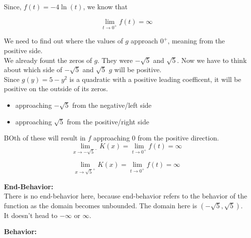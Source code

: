 \documentclass{ximera}
\begin{document}
Since, $f(t) = -4 \ln(t)$, we know that 


\[
\lim\limits_{t \to 0^+} f(t) = \infty
\]



We need to find out where the values of $g$ approach $0^+$, meaning from the positive side. \\


We already fount the zeros of $g$.  They were $-\sqrt{5}$ and $\sqrt{5}$.  Now we have to think about which side of $-\sqrt{5}$ and $\sqrt{5}$ $g$ will be positive. \\


Since $g(y) = 5 - y^2$ is a quadratic with a positive leading coefficent, it will be positive on the outside of its zeros. 

\begin{itemize}
\item approaching $-\sqrt{5}$ from the negative/left side
\item approaching $\sqrt{5}$ from the positive/right side
\end{itemize}

BOth of these will result in $f$ approaching $0$ from the positive direction. \\



\[
\lim\limits_{x \to -\sqrt{5}^-} K(x)  = \lim\limits_{t \to 0^+} f(t) = \infty
\]



\[
\lim\limits_{x \to \sqrt{5}^+} K(x)  = \lim\limits_{t \to 0^+} f(t) = \infty
\]
















\textbf{\textcolor{blue!55!black}{End-Behavior:}} \\

There is no end-behavior here, because end-behavior refers to the behavior of the function as the domain becomes unbounded.  The domain here is $(-\sqrt{5}, \sqrt{5})$. It doesn't head to $-\infty$ or $\infty$.











\textbf{\textcolor{blue!55!black}{Behavior:}} \\
\end{document}

